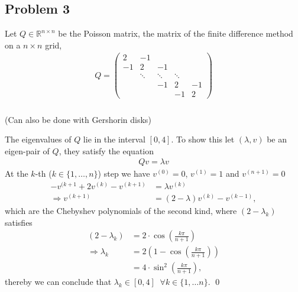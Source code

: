 \subsection{Problem 3}
Let $Q \in \mathbb{R}^{n \times n}$ be the Poisson matrix, the matrix of
the finite difference method on a $n \times n$ grid,
\begin{align}
    Q =
    \begin{pmatrix}
        2 & -1 &   &  &   \\
        -1& 2  & -1&  &   \\
          & \ddots  & \ddots & \ddots &   \\
          &   & -1 &  2 & -1\\
          &   &  &  -1 & 2
    \end{pmatrix}
\end{align}
\subsubsection{}
(Can also be done with Gershorin disks)
\newline

The eigenvalues of $Q$ lie in the interval $[0 ,4]$. To show this let
$(\lambda , v)$ be an eigen-pair of $Q$, they satisfy the equation
\begin{align}
    Qv = \lambda v
\end{align}
At the $k$-th ($k \in \{1,\ldots,n\}$) step we have $v^{(0)} = 0$, $v^{(1)} =
1$ and $v^{(n+1)} = 0$
\begin{align}
    -v^{(k+1} + 2v^{(k)} - v^{(k+1)} &= \lambda v^{(k)}\\
    \Rightarrow v^{(k+1)} &= (2-\lambda) v^{(k)} - v^{(k-1)},
\end{align}
which are the Chebyshev polynomials of the second kind, where $(2-\lambda_k)$
satisfies
\begin{align}
    (2-\lambda_k) &= 2\cdot \cos\left(\frac{k\pi}{n+1}\right)\\
    \Rightarrow \lambda_k &= 2\left( 1 - \cos\left( \frac{k\pi}{n+1} \right)
    \right) \\
          &=4\cdot\sin^2\left( \frac{k\pi}{n+1} \right),
\end{align}
thereby we can conclude that $\lambda_k \in [0, 4] \;\; \forall k \in \{1,
\dots n\}$. \qed
\subsubsection{}
